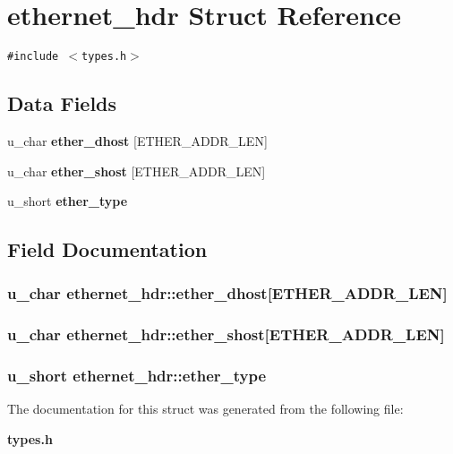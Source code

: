 \section{ethernet\_\-hdr Struct Reference}
\label{structethernet__hdr}
{\tt \#include $<$types.h$>$}

\subsection*{Data Fields}
\begin{CompactItemize}
\item 
u\_\-char {\bf ether\_\-dhost} [ETHER\_\-ADDR\_\-LEN]
\item 
u\_\-char {\bf ether\_\-shost} [ETHER\_\-ADDR\_\-LEN]
\item 
u\_\-short {\bf ether\_\-type}
\end{CompactItemize}


\subsection{Field Documentation}
\subsubsection[{ether\_\-dhost}]{\setlength{\rightskip}{0pt plus 5cm}u\_\-char {\bf ethernet\_\-hdr::ether\_\-dhost}[ETHER\_\-ADDR\_\-LEN]}\label{structethernet__hdr_3b3a3fc723542e40a46d3b6951318abc}


\subsubsection[{ether\_\-shost}]{\setlength{\rightskip}{0pt plus 5cm}u\_\-char {\bf ethernet\_\-hdr::ether\_\-shost}[ETHER\_\-ADDR\_\-LEN]}\label{structethernet__hdr_4cefb2b6ea2bfdc39604f1f3e0bdb546}


\subsubsection[{ether\_\-type}]{\setlength{\rightskip}{0pt plus 5cm}u\_\-short {\bf ethernet\_\-hdr::ether\_\-type}}\label{structethernet__hdr_9246ff9399c00b0e91b71bad197d1fc9}




The documentation for this struct was generated from the following file:\begin{CompactItemize}
\item 
{\bf types.h}\end{CompactItemize}
